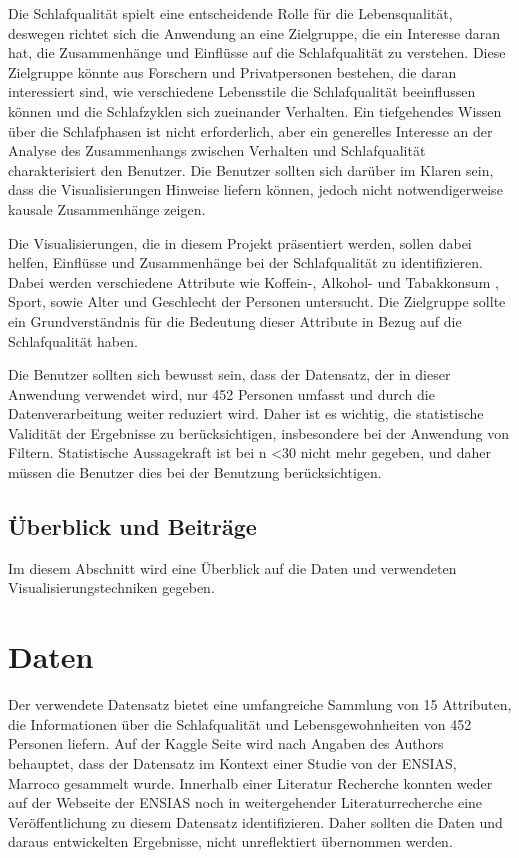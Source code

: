 \documentclass[usegeometry=true]{scrartcl}
\begin{document}
Die Schlafqualität spielt eine entscheidende Rolle für die Lebensqualität, deswegen richtet sich die Anwendung 
an eine Zielgruppe, die ein Interesse daran hat, die Zusammenhänge und Einflüsse auf die Schlafqualität zu verstehen.
 Diese Zielgruppe könnte aus Forschern und Privatpersonen bestehen, die daran interessiert sind, wie verschiedene 
 Lebensstile die Schlafqualität beeinflussen können und die Schlafzyklen sich zueinander Verhalten.
 Ein tiefgehendes Wissen über die Schlafphasen ist nicht erforderlich, aber ein generelles Interesse an der Analyse des Zusammenhangs zwischen Verhalten und Schlafqualität charakterisiert den Benutzer.
 Die Benutzer sollten sich darüber im Klaren sein, dass die Visualisierungen Hinweise liefern können, 
 jedoch nicht notwendigerweise kausale Zusammenhänge zeigen.

Die Visualisierungen, die in diesem Projekt präsentiert werden, sollen dabei helfen, Einflüsse und Zusammenhänge
 bei der Schlafqualität zu identifizieren. Dabei werden verschiedene Attribute wie Koffein-, Alkohol- und Tabakkonsum
 , Sport, sowie Alter und Geschlecht der Personen untersucht. Die Zielgruppe sollte ein Grundverständnis
  für die Bedeutung dieser Attribute in Bezug auf die Schlafqualität haben.

Die Benutzer sollten sich bewusst sein, dass der Datensatz, der in dieser Anwendung verwendet wird,
 nur 452 Personen umfasst und durch die Datenverarbeitung weiter reduziert wird. 
 Daher ist es wichtig, die statistische Validität der Ergebnisse zu berücksichtigen,
  insbesondere bei der Anwendung von Filtern. Statistische Aussagekraft ist bei n <30 nicht mehr gegeben,
   und daher müssen die Benutzer dies bei der Benutzung berücksichtigen.



\subsection{Überblick und Beiträge}
Im diesem Abschnitt wird eine Überblick auf die Daten und verwendeten Visualisierungstechniken gegeben. 

\section{Daten}

Der verwendete Datensatz bietet eine umfangreiche Sammlung von 15 Attributen, die Informationen 
über die Schlafqualität und Lebensgewohnheiten von 452 Personen liefern.
Auf der Kaggle Seite wird nach Angaben des Authors behauptet, dass der Datensatz im Kontext einer Studie von der ENSIAS, Marroco gesammelt wurde.
Innerhalb einer Literatur Recherche konnten weder auf der Webseite der ENSIAS noch in weitergehender Literaturrecherche eine Veröffentlichung zu diesem Datensatz identifizieren.
Daher sollten die Daten und daraus entwickelten Ergebnisse, nicht unreflektiert übernommen werden. 
\end{document}
